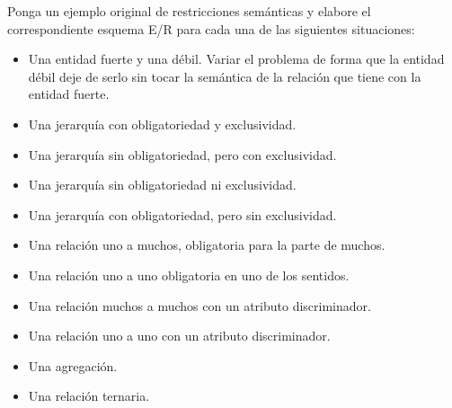 \begin{ejercicio} \label{ej:21}
    Ponga un ejemplo original de restricciones semánticas y elabore el correspondiente esquema E/R para cada
    una de las siguientes situaciones:
    \begin{itemize}
        \item Una entidad fuerte y una débil. Variar el problema de forma que la entidad débil deje de serlo sin tocar
        la semántica de la relación que tiene con la entidad fuerte.
        \item Una jerarquía con obligatoriedad y exclusividad.
        \item Una jerarquía sin obligatoriedad, pero con exclusividad.
        \item Una jerarquía sin obligatoriedad ni exclusividad.
        \item Una jerarquía con obligatoriedad, pero sin exclusividad.
        \item Una relación uno a muchos, obligatoria para la parte de muchos.
        \item Una relación uno a uno obligatoria en uno de los sentidos.
        \item Una relación muchos a muchos con un atributo discriminador.
        \item Una relación uno a uno con un atributo discriminador.
        \item Una agregación.
        \item Una relación ternaria.
    \end{itemize}
\end{ejercicio}
